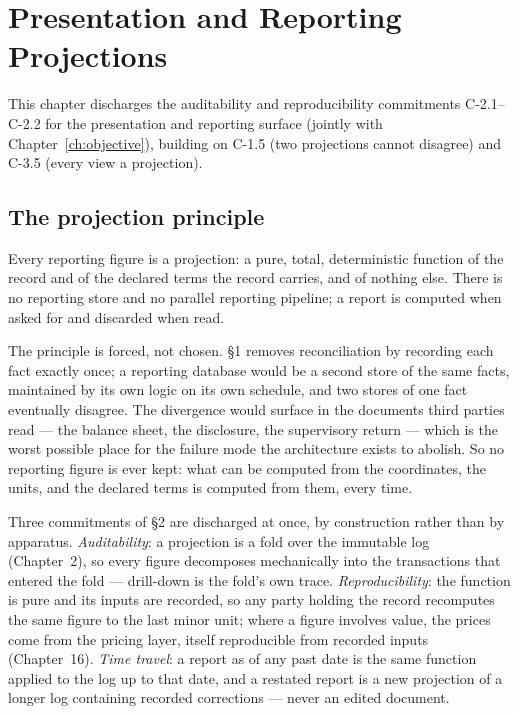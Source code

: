 \section{Presentation and Reporting Projections}\label{ch:reporting}

This chapter discharges the auditability and reproducibility commitments C-2.1--C-2.2 for the presentation and reporting surface (jointly with Chapter~\ref{ch:objective}), building on C-1.5 (two projections cannot disagree) and C-3.5 (every view a projection).

\subsection{The projection principle}

Every reporting figure is a projection: a pure, total, deterministic function of
the record and of the declared terms the record carries, and of nothing else.
There is no reporting store and no parallel reporting pipeline; a report is
computed when asked for and discarded when read.

The principle is forced, not chosen. \S 1 removes reconciliation by recording
each fact exactly once; a reporting database would be a second store of the same
facts, maintained by its own logic on its own schedule, and two stores of one
fact eventually disagree. The divergence would surface in the documents third
parties read --- the balance sheet, the disclosure, the supervisory return ---
which is the worst possible place for the failure mode the architecture exists
to abolish. So no reporting figure is ever kept: what can be computed from the
coordinates, the units, and the declared terms is computed from them, every
time.

Three commitments of \S 2 are discharged at once, by construction rather than by
apparatus. \emph{Auditability}: a projection is a fold over the immutable log
(Chapter~2), so every figure decomposes mechanically into the transactions that
entered the fold --- drill-down is the fold's own trace. \emph{Reproducibility}:
the function is pure and its inputs are recorded, so any party holding the
record recomputes the same figure to the last minor unit; where a figure
involves value, the prices come from the pricing layer, itself reproducible from
recorded inputs (Chapter~16). \emph{Time travel}: a report as of any past date
is the same function applied to the log up to that date, and a restated report
is a new projection of a longer log containing recorded corrections --- never an
edited document.

